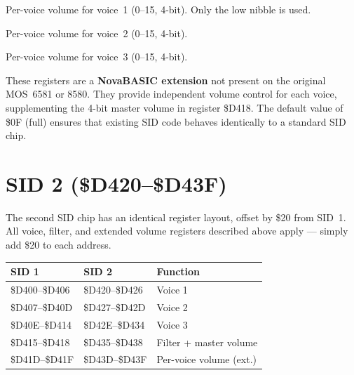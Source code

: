 
Per-voice volume for voice~1 (0--15, 4-bit).  Only the low nibble is used.


Per-voice volume for voice~2 (0--15, 4-bit).


Per-voice volume for voice~3 (0--15, 4-bit).

\begin{notebox}
These registers are a \textbf{NovaBASIC extension} not present on the
original MOS~6581 or 8580.  They provide independent volume control for each
voice, supplementing the 4-bit master volume in register \$D418.  The
default value of \$0F (full) ensures that existing SID code behaves
identically to a standard SID chip.
\end{notebox}


\section{SID 2 (\$D420--\$D43F)}
\label{sec:sid2}


The second SID chip has an identical register layout, offset by \$20 from
SID~1.  All voice, filter, and extended volume registers described above
apply --- simply add \$20 to each address.

\begin{center}
\small
\begin{tabular}{@{}lll@{}}
\toprule
\textbf{SID 1} & \textbf{SID 2} & \textbf{Function} \\
\midrule
\$D400--\$D406 & \$D420--\$D426 & Voice 1 \\
\$D407--\$D40D & \$D427--\$D42D & Voice 2 \\
\$D40E--\$D414 & \$D42E--\$D434 & Voice 3 \\
\$D415--\$D418 & \$D435--\$D438 & Filter + master volume \\
\$D41D--\$D41F & \$D43D--\$D43F & Per-voice volume (ext.) \\
\bottomrule
\end{tabular}
\end{center}


